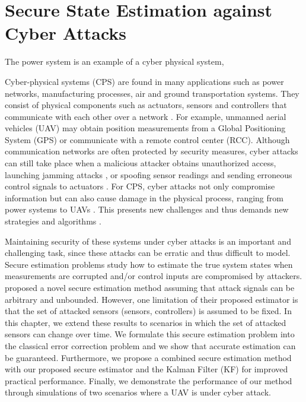 \documentclass[../thesis.tex]{subfiles}
\begin{document}


\section{Secure State Estimation against Cyber Attacks}

The power system is an example of a cyber physical system, 









Cyber-physical systems (CPS) are found in many applications such as power networks, manufacturing processes, air and ground transportation systems. They consist of physical components such as actuators, sensors and controllers that communicate with each other over a network \cite{kim2012cyber}. 
For example, unmanned aerial vehicles (UAV) may obtain position measurements from a Global Positioning System (GPS) or communicate with a remote control center (RCC). Although communication networks are often protected by security measures, cyber attacks can still take place when a malicious attacker obtains unauthorized access, launching jamming attacks \cite{Gligor}, or spoofing sensor readings and sending erroneous control signals to actuators \cite{Mo}. For CPS, cyber attacks not only compromise information but can also cause damage in the physical process, ranging from power systems \cite{teixeira2010cyber, liu2011false} to UAVs \cite{Hu:2016uav}. This presents new challenges and thus demands new strategies and algorithms \cite{Sastry}.

Maintaining security of these systems under cyber attacks is an important and challenging task, since these attacks can be erratic and thus difficult to model. Secure estimation problems study how to estimate the true system states when  measurements are corrupted and/or control inputs are compromised by attackers. \cite{Fawzi:2014} proposed a novel secure estimation method assuming that attack signals can be arbitrary and unbounded. However, one limitation of their proposed estimator is that the set of attacked sensors (sensors, controllers) is assumed to be fixed. 
In this chapter, we extend these results to scenarios in which the set of attacked sensors can change over time. We formulate this secure estimation problem into the classical error correction problem \cite{tao11} and we show that accurate estimation can be guaranteed. Furthermore, we propose a combined secure estimation method with our proposed secure estimator and the Kalman Filter (KF) for improved practical performance. Finally,  we demonstrate the performance of our method through simulations of two scenarios where a UAV is under cyber attack.
\end{document}
